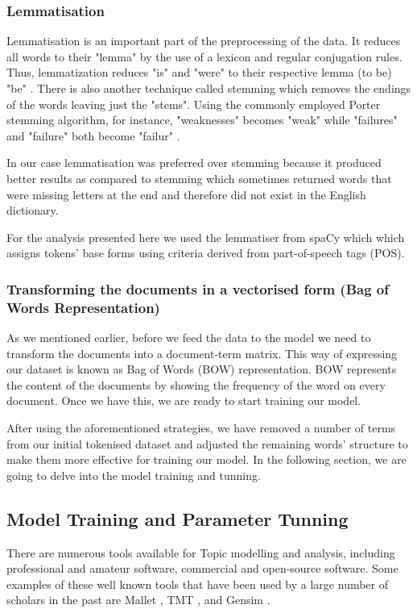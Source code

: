 \documentclass[twoside,12pt,a4paper]{article}
\begin{document}
\subsubsection{Lemmatisation}
Lemmatisation is an important part of the preprocessing of the data. It reduces all words to their "lemma" by the use of a lexicon and regular conjugation rules. Thus, lemmatization reduces "is" and "were" to their respective lemma (to be) "be" \citep{jacobi_quantitative_2016}. There is also another technique called stemming which removes the endings of the words leaving just the "stems". Using the commonly employed Porter stemming algorithm, for instance, "weaknesses" becomes "weak" while "failures" and "failure" both become "failur" \citep{jacobi_quantitative_2016}. 

In our case lemmatisation was preferred over stemming because it produced better results as compared to stemming which sometimes returned words that were missing letters at the end and therefore did not exist in the English dictionary.

For the analysis presented here we used the lemmatiser from spaCy \citep{spacy2} which which assigns tokens' base forms using criteria derived from part-of-speech tags (POS).

\subsubsection{Transforming the documents in a vectorised form (Bag of Words Representation)}
As we mentioned earlier, before we feed the data to the model we need to transform the documents into a document-term matrix. This way of expressing our dataset is known as Bag of Words (BOW) representation. BOW represents the content of the documents by showing the frequency of the word on every document. Once we have this, we are ready to start training our model.

After using the aforementioned strategies, we have removed a number of terms from our initial tokenised dataset and adjusted the remaining words' structure to make them more effective for training our model. In the following section, we are going to delve into the model training and tunning.

\subsection{Model Training and Parameter Tunning}
There are numerous tools available for Topic modelling and analysis, including professional and amateur software, commercial and open-source software. Some examples of these well known tools that have been used by a large number of scholars in the past are Mallet \citep{McCallumMALLET}, TMT \citep{2009-topic-modeling-social-sciences}, and Gensim \citep{jelodar_latent_2019}.
\end{document}
